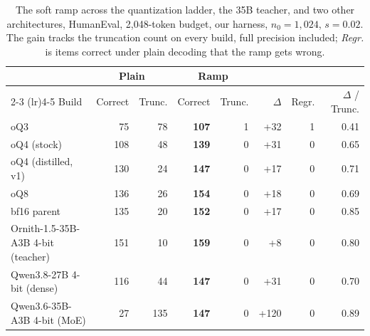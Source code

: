 \begin{table}[t]
\centering
\caption{The soft ramp across the quantization ladder, the 35B teacher, and two other architectures, HumanEval, 2{,}048-token budget, our harness, $n_0 = 1{,}024$, $s = 0.02$. The gain tracks the truncation count on every build, full precision included; \emph{Regr.} is items correct under plain decoding that the ramp gets wrong.}
\label{tab:generality}
\begin{tabular}{lrrrrrrr}
\toprule
 & \multicolumn{2}{c}{Plain} & \multicolumn{2}{c}{Ramp} & & & \\
\cmidrule(lr){2-3} \cmidrule(lr){4-5}
Build & Correct & Trunc. & Correct & Trunc. & $\Delta$ & Regr. & $\Delta$ / Trunc. \\
\midrule
oQ3 & 75 & 78 & \textbf{107} & 1 & +32 & 1 & 0.41 \\
oQ4 (stock) & 108 & 48 & \textbf{139} & 0 & +31 & 0 & 0.65 \\
oQ4 (distilled, v1) & 130 & 24 & \textbf{147} & 0 & +17 & 0 & 0.71 \\
oQ8 & 136 & 26 & \textbf{154} & 0 & +18 & 0 & 0.69 \\
bf16 parent & 135 & 20 & \textbf{152} & 0 & +17 & 0 & 0.85 \\
Ornith-1.5-35B-A3B 4-bit (teacher) & 151 & 10 & \textbf{159} & 0 & +8 & 0 & 0.80 \\
\midrule
Qwen3.8-27B 4-bit (dense) & 116 & 44 & \textbf{147} & 0 & +31 & 0 & 0.70 \\
Qwen3.6-35B-A3B 4-bit (MoE) & 27 & 135 & \textbf{147} & 0 & +120 & 0 & 0.89 \\
\bottomrule
\end{tabular}
\end{table}
